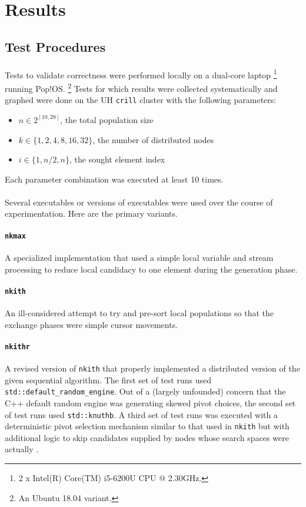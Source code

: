\documentclass[11pt,epsf]{article}
\begin{document}
\section{Results}{

  \subsection{Test Procedures}{
    \paragraph{}{
      Tests to validate correctness were performed locally on a dual-core laptop
      \footnote{2 x Intel(R) Core(TM) i5-6200U CPU @ 2.30GHz.} running Pop!OS.
      \footnote{An Ubuntu 18.04 variant.}
      Tests for which results were collected systematically and graphed were
      done on the UH \texttt{crill} cluster with the following parameters:
      \begin{itemize}
      \item{$n \in 2^{[10,28]}$, the total population size}
      \item{$k \in \{1,2,4,8,16,32\}$, the number of distributed nodes}
      \item{$i \in \{1, n/2, n\}$, the sought element index}
      \end{itemize}
      Each parameter combination was executed at least 10 times.
    }
    \paragraph{}{
      Several executables or versions of executables were used over the course
      of experimentation. Here are the primary variants.
    }
    \paragraph{\texttt{nkmax}}{
      A specialized implementation that used a simple local variable and stream
      processing to reduce local candidacy to one element during the generation phase.
    }
    \paragraph{\texttt{nkith}}{
      An ill-considered attempt to try and pre-sort local populations so that
      the exchange phases were simple cursor movements.
    }
    \paragraph{\texttt{nkithr}}{
      A revised version of \texttt{nkith} that properly implemented a distributed
      version of the given sequential algorithm. The first set of test runs used
      \texttt{std::default\_random\_engine}\autocite{random}. Out of a (largely unfounded)
      concern that the C++ default random engine was generating skewed pivot choices,
      the second set of test runs used \texttt{std::knuthb}\autocite{knuthb}.
      A third set of test runs was executed with a deterministic pivot selection mechanism
      similar to that used in \texttt{nkith} but with additional logic
      to skip candidates supplied by nodes whose search spaces were
      actually \emptyset.
    }
}}
\end{document}
